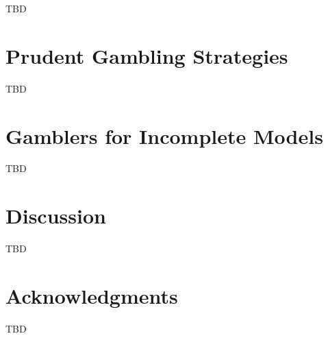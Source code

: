 \documentclass[11pt]{article}
\theoremstyle{definition}
\theoremstyle{plain}
\begin{document}
TBD

\section{Prudent Gambling Strategies}
\label{sec:prudent}

TBD

\section{Gamblers for Incomplete Models}
\label{sec:construction}

TBD

\section{Discussion}

TBD

\section*{Acknowledgments}

TBD



\end{document}
